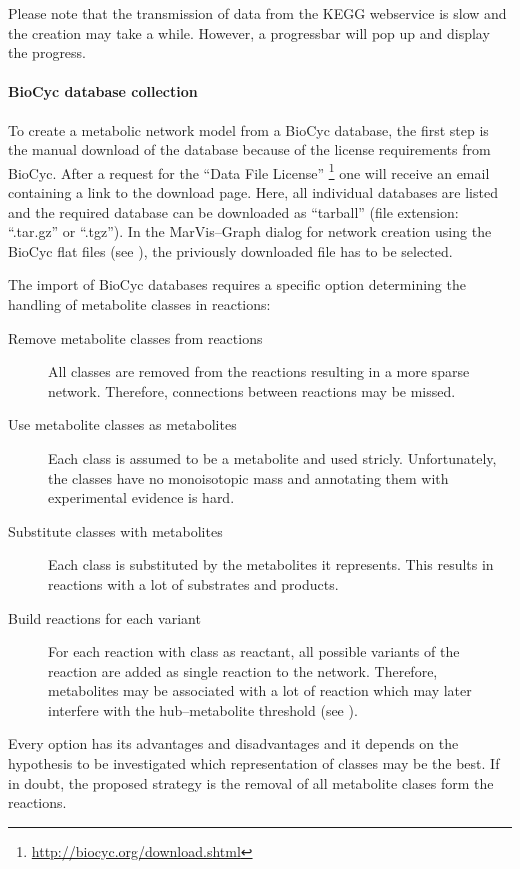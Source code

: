 \documentclass[titlepage,a4paper,twoside]{article}
\newcommand{\mg}{MarVis--Graph\xspace}
\newcommand{\pref}[1]{\prettyref{#1}}
\begin{document}
Please note that the transmission of data from the KEGG webservice is slow and
the creation may take a while. However, a progressbar will
pop up and display the progress.

\paragraph{BioCyc database collection} \cite{caspi2008metacyc,
caspi2010metacyc,caspi2012metacyc} To create a metabolic network model from
a BioCyc database, the first step is the manual download of the database
because of the license requirements from BioCyc.
After a request for the ``Data File License''
\footnote{\url{http://biocyc.org/download.shtml}} one will receive an email
containing a link to the download page. Here, all individual databases are
listed and the required database can be downloaded as ``tarball'' (file
extension: ``.tar.gz'' or ``.tgz'').
In the \mg dialog for network creation using the BioCyc flat files (see
\pref{fig:newnetwork_biocyc}), the priviously downloaded file has to be selected. 

The import of BioCyc databases requires a specific option determining the
handling of metabolite classes in reactions:
\begin{description}
	\item[Remove metabolite classes from reactions]
		All classes are removed from the reactions resulting in a more sparse
		network. Therefore, connections between reactions may be missed.
	\item[Use metabolite classes as metabolites]
		Each class is assumed to be a metabolite and used stricly. Unfortunately, the classes have no
		monoisotopic mass and annotating them with experimental evidence is hard.
	\item[Substitute classes with metabolites]
		Each class is substituted by the metabolites it represents. This
		results in reactions with a lot of substrates and products.
	\item[Build reactions for each variant]
		For each reaction with class as reactant, all possible variants of the
		reaction are added as single reaction to the network.
		Therefore, metabolites may be associated with a lot of reaction which
		may later interfere with the hub--metabolite threshold (see
		\pref{ssec:calculate}).
\end{description}
Every option has its advantages and disadvantages and it depends on the
hypothesis to be investigated which representation of classes may be the best.
If in doubt, the proposed strategy is the removal of all metabolite clases
form the reactions.
\end{document}

